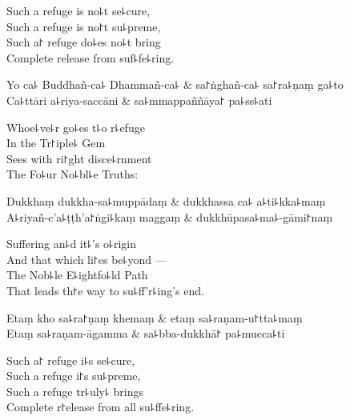 \begin{english}
  Such a refuge is no꜕t se꜕cure,\\
  Such a refuge is no꜓t su꜕preme,\\
  Such a꜓ refuge do꜕es no꜕t bring\\
  Complete release from suf꜕fe꜕ring.
\end{english}

\begin{twochants}
  Yo ca꜕ Buddhañ-ca꜕ Dhammañ-ca꜕ & sa꜓ṅghañ-ca꜕ sa꜓ra꜕ṇaṃ ga꜕to \\
  Ca꜕ttāri a꜕riya-saccāni & sa꜕mmappaññāya꜓ pa꜕ss꜕ati \\
\end{twochants}

\begin{english}
  Whoe꜕ve꜕r go꜕es t꜕o r꜕efuge\\
  In the Tr꜓iple꜕ Gem\\
  Sees with ri꜓ght disce꜕rnment\\
  The Fo꜕ur No꜕bl꜕e Truths:
\end{english}

\begin{twochants}
  Dukkhaṃ dukkha-sa꜕muppādaṃ & dukkhassa ca꜕ a꜕ti꜕kka꜕maṃ \\
  A꜕riyañ-c'a꜕ṭṭh'a꜓ṅgi꜕kaṃ maggaṃ & dukkhūpasa꜕ma꜕-gāmi꜓naṃ \\
\end{twochants}

\begin{english}
  Suffering an꜕d it꜕'s o꜕rigin\\
  And that which li꜓es be꜕yond ---\\
  The Nob꜕le E꜕ightfo꜕ld Path\\
  That leads th꜓e way to su꜕ff'r꜕ing's end.
\end{english}

\begin{twochants}
  Etaṃ kho sa꜕ra꜓ṇaṃ khemaṃ & etaṃ sa꜕raṇam-u꜓tta꜕maṃ \\
  Etaṃ sa꜕raṇam-āgamma & sa꜕bba-dukkhā꜓ pa꜕mucca꜕ti \\
\end{twochants}

\begin{english}
  Such a꜓ refuge i꜕s se꜕cure,\\
  Such a refuge i꜓s su꜕preme,\\
  Such a refuge tr꜕uly꜕ brings\\
  Complete r꜓elease from all su꜕ffe꜕ring.
\end{english}

